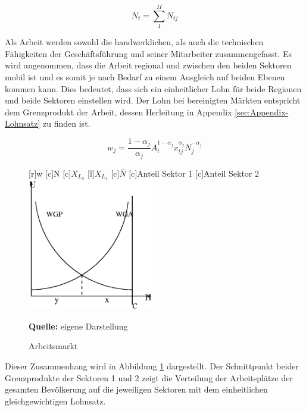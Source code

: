 	\begin{equation}
		N_t=\sum_I^{II}{N_{tj}}
	\end{equation}


Als Arbeit werden sowohl die handwerklichen, als auch die technischen Fähigkeiten der Geschäftsführung und seiner Mitarbeiter zusammengefasst. Es wird angenommen, dass die Arbeit regional und zwischen den beiden Sektoren mobil ist und es somit je nach Bedarf zu einem Ausgleich auf beiden Ebenen kommen kann. Dies bedeutet, dass sich ein einheitlicher Lohn für beide Regionen und beide Sektoren einstellen wird. Der Lohn bei bereinigten Märkten entspricht dem Grenzprodukt der Arbeit, dessen Herleitung in Appendix \ref{sec:Appendix-Lohnsatz} zu finden ist.  


	\begin{equation}
		w_j=\frac{1-\alpha_j}{\alpha_j}A_t^{1-\alpha_j}x_{tj}^{\alpha_j}N_j^{-\alpha_j}
	\end{equation}


	\begin{figure}[htbp]
		\vspace{0.2cm}
		\centering
		[r]{w}
		[c]{N}
		[c]{$X_{L_{2}}$}
		[l]{$X_{L_{1}}$}
		[c]{$\bar{N}$}
		[c]{Anteil Sektor 1}
		[c]{Anteil Sektor 2}
		\includegraphics[width=0.49\textwidth]{images/Abbildungen/neuest5.eps}
		\caption{Arbeitsmarkt}
		\hfill \footnotesize\sffamily\textbf{Quelle:} eigene Darstellung
		\label{Grenzentlohnung}
		\vspace{0.48cm}
	\end{figure}

Dieser Zusammenhang wird in Abbildung \ref{Grenzentlohnung} dargestellt. Der Schnittpunkt beider Grenzprodukte der Sektoren 1 und 2 zeigt die Verteilung der Arbeitsplätze der gesamten Bevölkerung auf die jeweiligen Sektoren mit dem einheitlichen gleichgewichtigen Lohnsatz. 


